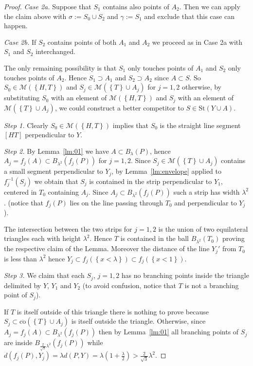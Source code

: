 \documentclass{article}
\newcommand{\enclose}[1]{\left(#1\right)}
\newcommand{\ENCLOSE}[1]{\left\{#1\right\}}
\newcommand{\St}{\mathrm{St}}
\newcommand{\M}{\mathcal{M}}
\newcommand{\co}{\mathrm{co}}
\theoremstyle{definition}
\theoremstyle{remark}
\begin{document}
\begin{proof}
  \emph{Case 2a.} 
  Suppose that $S_1$ contains also points of $A_2$.
  Then we can apply the claim above with 
  $\sigma:= S_0 \cup S_2$ and 
  $\gamma:= S_1$ and exclude that this case can happen.
  
  \emph{Case 2b.} If $S_2$ contains points of both 
  $A_1$ and $A_2$ we proceed 
  as in Case 2a with $S_1$ and $S_2$ interchanged.
  
  The only remaining possibility is that $S_1$ 
  only touches points of $A_1$ 
  and $S_2$ only touches points of $A_2$. 
  Hence $S_1\supset A_1$ and $S_2\supset A_2$ since $A\subset S$.
  So $S_0\in \M(\ENCLOSE{H,T})$  
  and $S_j \in \M(\ENCLOSE{T} \cup A_j)$ for $j=1,2$
  otherwise, by substituting $S_0$ with an element of $\M(\ENCLOSE{H,T})$
  and $S_j$ with an element of $\M(\ENCLOSE{T}\cup A_j)$,
  we could construct a better competitor 
  to $S\in \St(Y\cup A)$.
  
  \emph{Step 1.} 
  Clearly $S_0\in \M(\ENCLOSE{H,T})$ implies that $S_0$ is the straight 
  line segment $[HT]$ perpendicular to $Y$.
  
  \emph{Step 2.}
  By Lemma~\ref{lm:01} we have $A\subset B_\lambda(P)$,
  hence $A_j = f_j(A) \subset B_{\lambda^2}(f_j(P))$
  for $j=1,2$.
  Since $S_j \in \M(\ENCLOSE{T}\cup A_j)$
  contains a small segment perpendicular to $Y_j$,
  by Lemma~\ref{lm:envelope} applied to $f_j^{-1}(S_j)$
  we obtain that $S_j$ is contained in the strip perpendicular 
  to $Y_1$, centered in $T_0$
  containing $A_j$. 
  Since $A_j\subset B_{\lambda^2}(f_j(P))$
  such a strip has width $\lambda^2$.
  (notice that $f_j(P)$ lies on the line passing through $T_0$ and perpendicular 
  to $Y_j$).
  
  The intersection between the two strips for $j=1,2$ 
  is the union of two equilateral 
  triangles each with height $\lambda^2$. 
  Hence $T$ is contained in the ball
  $B_{\lambda^2}(T_0)$ proving the respective claim of the Lemma.
  Moreover the distance of the line $Y_j'$ from $T_0$ is less than 
  $\lambda^2$ hence $Y_j\subset f_j(\ENCLOSE{x<\lambda})
  \subset f_j(\ENCLOSE{x<1})$.
  
  \emph{Step 3.}
  We claim that each $S_j$, $j=1,2$ has no branching points inside the triangle 
  delimited by $Y$, $Y_1$ and $Y_2$ 
  (to avoid confusion, notice that $T$ is not a branching point of $S_j$).
 
  If $T$ is itself outside of this triangle there is nothing to prove
  because $S_j\subset \overline{\co}(\ENCLOSE{T}\cup A_j)$ 
  is itself outside the triangle.
  Otherwise, 
  since $A_j=f_j(A)\subset B_{\lambda^2}(f_j(P))$
  then by Lemma~\ref{lm:01} all branching points of $S_j$ 
  are inside $B_{\frac{2}{\sqrt 3}\lambda^2}(f_j(P))$ while 
  $d(f_j(P),Y_j)=\lambda d(P,Y)
  = \lambda \enclose{1+\frac{\lambda} 2 }
  > \frac{2}{\sqrt 3}\lambda^2$.
  

\end{proof}
\end{document}
